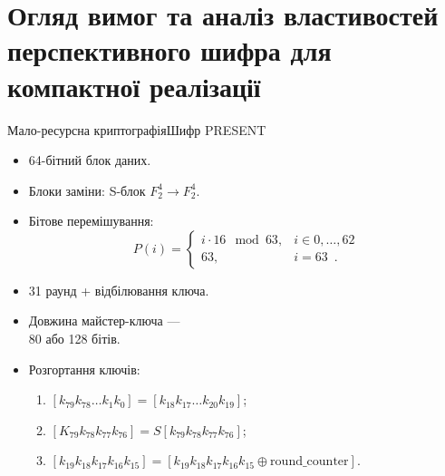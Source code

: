 \documentclass[10pt, ucs, handout]{beamer}
\begin{document}
\section{Огляд вимог та аналіз властивостей перспективного шифра для компактної реалізації}
\begin{frame}{Мало-ресурсна криптографія}{Шифр PRESENT}
    \small
    \begin{minipage}[t]{0.65\textwidth}
        \begin{itemize}
            \item 64-бітний блок даних.
            \item Блоки заміни: S-блок $F_2^4 \rightarrow F_2^4$. \\
            \item Бітове перемішування: 
                \begin{equation}
                    \label{eqn:player}
                    \nonumber
                    P(i) = \left\{
                    \begin{array}{ll}
                        i \cdot 16 \mod 63, & i \in {0, \hdots, 62} \\
                        63,  & i = 63 \enspace.
                    \end{array} \right.
                \end{equation}
            \item 31 раунд + відбілювання ключа.
            \item Довжина майстер-ключа --- \\
                80 або 128 бітів.
            \item Розгортання ключів:
                \begin{enumerate}
                    \setlength{\itemsep}{1pt}
                        \setlength{\parskip}{0pt}
                        \setlength{\parsep}{0pt}
                    \item $ [k_{79} k_{78} \hdots k_1 k_0] = [k_{18} k_{17} \hdots k_{20} k_{19}] $;
                    \item $ [K_{79} k_{78} k_{77} k_{76}] = S[k_{79} k_{78} k_{77} k_{76}] $;
                    \item $ [k_{19} k_{18} k_{17} k_{16} k_{15}] = [k_{19} k_{18} k_{17} k_{16} k_{15} 
                        \oplus \mbox{round\_counter}] $.
                \end{enumerate}
        \end{itemize}
    \end{minipage}%
    \begin{minipage}[t]{0.35\linewidth}

\end{minipage}
\end{frame}
\end{document}

